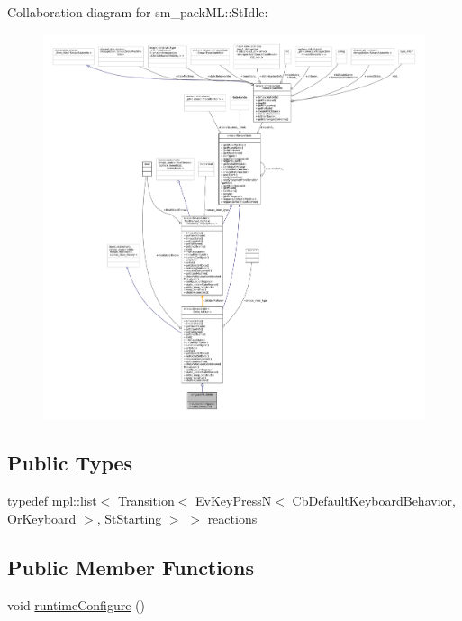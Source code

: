 Collaboration diagram for sm\+\_\+pack\+ML\+:\+:St\+Idle\+:
\nopagebreak
\begin{figure}[H]
\begin{center}
\leavevmode
\includegraphics[width=350pt]{structsm__packML_1_1StIdle__coll__graph}
\end{center}
\end{figure}
\subsection*{Public Types}
\begin{DoxyCompactItemize}
\item 
typedef mpl\+::list$<$ Transition$<$ Ev\+Key\+PressN$<$ Cb\+Default\+Keyboard\+Behavior, \hyperlink{classsm__packML_1_1OrKeyboard}{Or\+Keyboard} $>$, \hyperlink{structsm__packML_1_1StStarting}{St\+Starting} $>$ $>$ \hyperlink{structsm__packML_1_1StIdle_a5b61a5e6d7cd41d7e53d4e3a89a53c6a}{reactions}
\end{DoxyCompactItemize}
\subsection*{Public Member Functions}
\begin{DoxyCompactItemize}
\item 
void \hyperlink{structsm__packML_1_1StIdle_a4b0427716c4054b1345876384066473e}{runtime\+Configure} ()
\end{DoxyCompactItemize}
